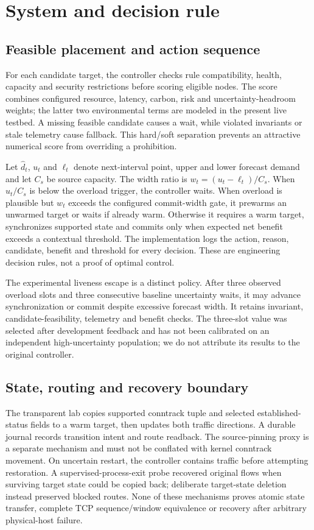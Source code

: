 \documentclass[11pt]{article}
\begin{document}
\section{System and decision rule}
\subsection{Feasible placement and action sequence}
For each candidate target, the controller checks rule compatibility, health, capacity and security restrictions before scoring eligible nodes. The score combines configured resource, latency, carbon, risk and uncertainty-headroom weights; the latter two environmental terms are modeled in the present live testbed. A missing feasible candidate causes a wait, while violated invariants or stale telemetry cause fallback. This hard/soft separation prevents an attractive numerical score from overriding a prohibition.

Let $\hat d_t$, $u_t$ and $\ell_t$ denote next-interval point, upper and lower forecast demand and let $C_s$ be source capacity. The width ratio is $w_t=(u_t-\ell_t)/C_s$. When $u_t/C_s$ is below the overload trigger, the controller waits. When overload is plausible but $w_t$ exceeds the configured commit-width gate, it prewarms an unwarmed target or waits if already warm. Otherwise it requires a warm target, synchronizes supported state and commits only when expected net benefit exceeds a contextual threshold. The implementation logs the action, reason, candidate, benefit and threshold for every decision. These are engineering decision rules, not a proof of optimal control.

The experimental liveness escape is a distinct policy. After three observed overload slots and three consecutive baseline uncertainty waits, it may advance synchronization or commit despite excessive forecast width. It retains invariant, candidate-feasibility, telemetry and benefit checks. The three-slot value was selected after development feedback and has not been calibrated on an independent high-uncertainty population; we do not attribute its results to the original controller.

\subsection{State, routing and recovery boundary}
The transparent lab copies supported conntrack tuple and selected established-status fields to a warm target, then updates both traffic directions. A durable journal records transition intent and route readback. The source-pinning proxy is a separate mechanism and must not be conflated with kernel conntrack movement. On uncertain restart, the controller contains traffic before attempting restoration. A supervised-process-exit probe recovered original flows when surviving target state could be copied back; deliberate target-state deletion instead preserved blocked routes. None of these mechanisms proves atomic state transfer, complete TCP sequence/window equivalence or recovery after arbitrary physical-host failure.
\end{document}
